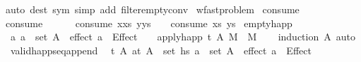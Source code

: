 \begin{isabellebody}
{\isacharparenleft}{\kern0pt}auto\ dest{\isacharcolon}{\kern0pt}\ sym\ simp\ add{\isacharcolon}{\kern0pt}\ filter{\isacharunderscore}{\kern0pt}empty{\isacharunderscore}{\kern0pt}conv{\isacharparenright}{\kern0pt}%
\endisatagproof
{\isafoldproof}%
%
\isadelimproof
%
\endisadelimproof
%
\isadelimdocument
%
\endisadelimdocument
%
\isatagdocument
%
\isamarkuptrue%
%
\endisatagdocument
{\isafolddocument}%
%
\isadelimdocument
%
\endisadelimdocument
{}\isamarkupfalse%
\ wf{\isacharunderscore}{\kern0pt}ast{\isacharunderscore}{\kern0pt}problem\isanewline
{}\isanewline
\isanewline
{}\isamarkupfalse%
\ consume{}\ \isanewline
{\isachardoublequoteopen}consume{}\ {\isacharbrackleft}{\kern0pt}{\isacharbrackright}{\kern0pt}\ {\isacharbrackleft}{\kern0pt}{\isacharbrackright}{\kern0pt}\ {\isacharequal}{\kern0pt}\ {}{\isachardoublequoteclose}\isanewline
{\isacharbar}{\kern0pt}\ \ {\isachardoublequoteopen}consume{}\ {\isacharparenleft}{\kern0pt}x{\isacharhash}{\kern0pt}xs{\isacharparenright}{\kern0pt}\ {\isacharparenleft}{\kern0pt}y{\isacharhash}{\kern0pt}ys{\isacharparenright}{\kern0pt}\ {\isacharequal}{\kern0pt}\ {}\ {\isacharplus}{\kern0pt}\ consume{}\ xs\ ys{\isachardoublequoteclose}\isanewline
\isanewline
{}\isamarkupfalse%
\ empty{\isacharunderscore}{\kern0pt}happ{\isacharcolon}{\kern0pt}\isanewline
\ {\isachardoublequoteopen}{\isacharparenleft}{\kern0pt}{\isasymAnd}a{\isachardot}{\kern0pt}\ a\ {\isasymin}\ set\ A\ {\isasymLongrightarrow}\ effect\ a\ {\isacharequal}{\kern0pt}\ Effect\ {\isacharbrackleft}{\kern0pt}{\isacharbrackright}{\kern0pt}\ {\isacharbrackleft}{\kern0pt}{\isacharbrackright}{\kern0pt}{\isacharparenright}{\kern0pt}\ {\isasymLongrightarrow}\ apply{\isacharunderscore}{\kern0pt}happ\ {\isacharparenleft}{\kern0pt}t{\isacharcomma}{\kern0pt}\ A{\isacharparenright}{\kern0pt}\ M\ {\isacharequal}{\kern0pt}\ M{\isachardoublequoteclose}\isanewline
%
\isadelimproof
\ \ %
\endisadelimproof
%
\isatagproof
{}\isamarkupfalse%
\ {\isacharparenleft}{\kern0pt}induction\ A{\isacharparenright}{\kern0pt}\ auto%
\endisatagproof
{\isafoldproof}%
%
\isadelimproof
\isanewline
%
\endisadelimproof
\isanewline
{}\isamarkupfalse%
\ valid{\isacharunderscore}{\kern0pt}happ{\isacharunderscore}{\kern0pt}seq{\isacharunderscore}{\kern0pt}append{\isacharunderscore}{\kern0pt}{}{\isacharcolon}{\kern0pt}\isanewline
\ \ {\isachardoublequoteopen}{\isasymlbrakk}{\isasymAnd}t\ A\ a{\isachardot}{\kern0pt}{\isasymlbrakk}{\isacharparenleft}{\kern0pt}t{\isacharcomma}{\kern0pt}\ A{\isacharparenright}{\kern0pt}\ {\isasymin}\ set\ hs{}{\isacharsemicolon}{\kern0pt}\ a\ {\isasymin}\ set\ A{\isasymrbrakk}\ {\isasymLongrightarrow}\ effect\ a\ {\isacharequal}{\kern0pt}\ Effect\ {\isacharbrackleft}{\kern0pt}{\isacharbrackright}{\kern0pt}\ {\isacharbrackleft}{\kern0pt}{\isacharbrackright}{\kern0pt}{\isacharsemicolon}{\kern0pt}\isanewline

\end{isabellebody}
